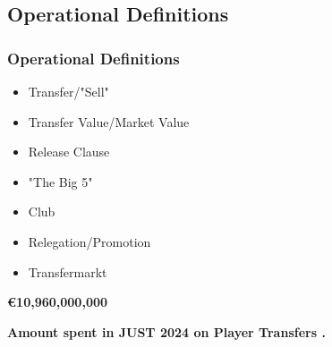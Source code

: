 \documentclass[t,aspectratio=169,xcolor=dvipsnames]{beamer}
\begin{document}
\subsection{Operational Definitions}

\begin{frame}
    \frametitle{Operational Definitions} 
     \begin{itemize}
        \item Transfer/"Sell"
        \item Transfer Value/Market Value
        \item Release Clause
        \item "The Big 5"
        \item Club
        \item Relegation/Promotion
        \item Transfermarkt
    \end{itemize}
\end{frame}
\begin{frame}
    
    \begin{center}
        \vspace{3cm} %
        \huge{\textbf{€10,960,000,000}}
        \vspace{2cm} %
    \end{center}

\end{frame}

\begin{frame}
    
    \begin{center}
        \vspace{3cm} %
        \huge{\textbf{Amount spent in JUST 2024 on Player Transfers \citep{TransferSpending}.}}
        \vspace{2cm} %
    \end{center}

\end{frame}
\end{document}
